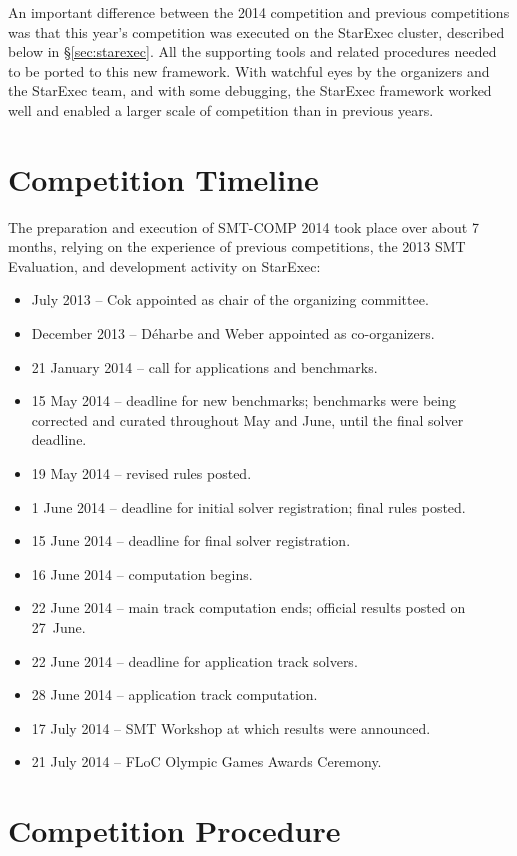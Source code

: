 \documentclass[twoside,11pt]{article}
\begin{document}
An important difference between the 2014 competition and previous competitions was that this year's competition was executed on the StarExec cluster, described below in \S\ref{sec:starexec}. All the supporting tools and related procedures needed to be ported to this new framework. With watchful eyes by the organizers and the StarExec team, and with some debugging, the StarExec framework worked well and enabled a larger scale of competition than in previous years.

\section{Competition Timeline}
\label{sec:timeline}

The preparation and execution of SMT-COMP 2014 took place over about 7 months, relying on the experience of previous competitions, the 2013 SMT Evaluation, and development activity on StarExec:
\begin{itemize}
\item July 2013 -- Cok appointed as chair of the organizing committee.
\item December 2013 -- D\'{e}harbe and Weber appointed as co-organizers.
\item 21 January 2014 -- call for applications and benchmarks.
\item 15 May 2014 -- deadline for new benchmarks; benchmarks were being corrected and curated throughout May and June, until the final solver deadline.
\item 19 May 2014 -- revised rules posted.
\item 1 June 2014 -- deadline for initial solver registration; final rules posted.
\item 15 June 2014 -- deadline for final solver registration.
\item 16 June 2014 -- computation begins.
\item 22 June 2014 -- main track computation ends; official results posted on 27~June.
\item 22 June 2014 -- deadline for application track solvers.
\item 28 June 2014 -- application track computation.
\item 17 July 2014 -- SMT Workshop at which results were announced.
\item 21 July 2014 -- FLoC Olympic Games Awards Ceremony.
\end{itemize}

\section{Competition Procedure} 
\label{sec:procedure}
\end{document}

